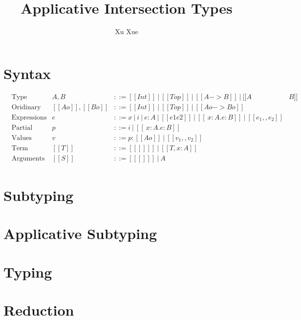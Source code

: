 \documentclass[a4paper]{article}
\title{Applicative Intersection Types}
\author{Xu Xue}
\begin{document}
\maketitle

\section{Syntax}

\begin{align*}
  &\text{Type} &A, B&::= [[Int]] ~|~ [[Top]] ~|~ [[A-> B]] ~|~ [[ A & B ]]\\
  &\text{Oridinary Type} &[[Ao]], [[Bo]]&::= [[Int]] ~|~ [[Top]] ~|~ [[Ao -> Bo]]\\
  &\text{Expressions} &e    &::= x ~|~ i ~|~ e:A ~|~ [[e1 e2]] ~|~ [[ \ x : A .e : B]]~|~ [[e_1,,e_2]] \\
  &\text{Partial Values} &p   &::= i~|~ [[ \ x : A .e : B]] \\
  &\text{Values} &v   &::= p:[[Ao]] ~|~ [[v_1,,v_2]]\\
  &\text{Term contexts} &[[T]] &::=  [[ [] ]] ~|~ [[ T, x:A ]] \\
  &\text{Arguments} &[[S]] &::= [[ [] ]] ~|~ A \\
\end{align*}

\section{Subtyping}

\ottdefnsSplitType

\section{Applicative Subtyping}

\ottdefnsUnifiedSubtyping

\section{Typing}

\ottdefnsTyping

\section{Reduction}

\ottdefnsCasting

\ottdefnsParallelApplication

\ottdefnsReduction


\end{document}
